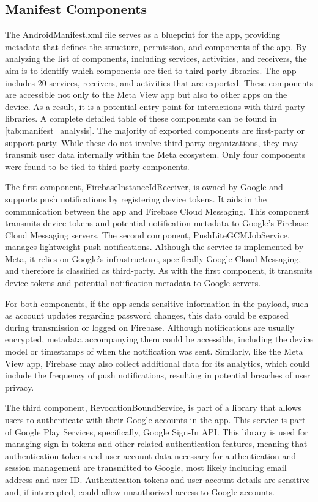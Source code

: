 \subsection*{Manifest Components}
The AndroidManifest.xml file serves as a blueprint for the app, providing metadata that defines the structure, permission, and components of the app. By analyzing the list of components, including services, activities, and receivers, the aim is to identify which components are tied to third-party libraries. The app includes 20 services, receivers, and activities that are exported. These components are accessible not only to the Meta View app but also to other apps on the device. As a result, it is a potential entry point for interactions with third-party libraries. A complete detailed table of these components can be found in \ref{tab:manifest_analysis}. The majority of exported components are first-party or support-party. While these do not involve third-party organizations, they may transmit user data internally within the Meta ecosystem. Only four components were found to be tied to third-party components.

The first component, FirebaseInstanceIdReceiver, is owned by Google and supports push notifications by registering device tokens. It aids in the communication between the app and Firebase Cloud Messaging. This component transmits device tokens and potential notification metadata to Google's Firebase Cloud Messaging servers. The second component, PushLiteGCMJobService, manages lightweight push notifications. Although the service is implemented by Meta, it relies on Google's infrastructure, specifically Google Cloud Messaging, and therefore is classified as third-party. As with the first component, it transmits device tokens and potential notification metadata to Google servers.

For both components, if the app sends sensitive information in the payload, such as account updates regarding password changes, this data could be exposed during transmission or logged on Firebase. Although notifications are usually encrypted, metadata accompanying them could be accessible, including the device model or timestamps of when the notification was sent. Similarly, like the Meta View app, Firebase may also collect additional data for its analytics, which could include the frequency of push notifications, resulting in potential breaches of user privacy.

The third component, RevocationBoundService, is part of a library that allows users to authenticate with their Google accounts in the app. This service is part of Google Play Services, specifically, Google Sign-In API. This library is used for managing sign-in tokens and other related authentication features, meaning that authentication tokens and user account data necessary for authentication and session management are transmitted to Google, most likely including email address and user ID. Authentication tokens and user account details are sensitive and, if intercepted, could allow unauthorized access to Google accounts.

